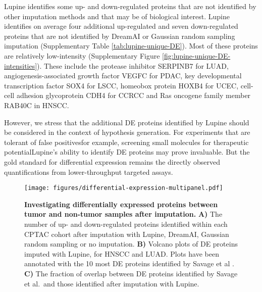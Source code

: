 \documentclass{article}
\newcommand{\fixme}[1]{{\color{red}{#1}}}
\begin{document}

Lupine identifies some up- and down-regulated proteins that are not identified by other imputation methods and that may be of biological interest. Lupine identifies on average four additional up-regulated and seven down-regulated proteins that are not identified by DreamAI or Gaussian random sampling imputation (Supplementary Table \ref{tab:lupine-unique-DE}). Most of these proteins are relatively low-intensity (Supplementary Figure \ref{fig:lupine-unique-DE-intensities}). These include the protease inhibitor SERPINB7 for LUAD, angiogenesis-associated growth factor VEGFC for PDAC, key developmental transcription factor SOX4 for LSCC, homeobox protein HOXB4 for UCEC, cell-cell adhesion glycoprotein CDH4 for CCRCC and Ras oncogene family member RAB40C in HNSCC. 

However, we stress that the additional DE proteins identified by Lupine should be considered in the context of hypothesis generation. For experiments that are tolerant of false positives\textemdash for example, screening small molecules for therapeutic potential\textemdash Lupine’s ability to identify DE proteins may prove invaluable. But the gold standard for differential expression remains the directly observed quantifications from lower-throughput targeted assays. 

\begin{figure}
  \centering
  \texttt{[image: figures/differential-expression-multipanel.pdf]}
  \caption{{\bf Investigating differentially expressed proteins between tumor and non-tumor samples after imputation.} 
  \textbf{A)} The number of up- and down-regulated proteins identified  within each CPTAC cohort after imputation with Lupine, DreamAI, Gaussian random sampling or no imputation. 
  \textbf{B)} Volcano plots of DE proteins imputed with Lupine, for HNSCC and LUAD.
  Plots have been annotated with the 10 most DE proteins identified by Savage et al \cite{savage-2024}.
  \textbf{C)} The fraction of overlap between DE proteins identified by Savage et al.\ and those identified after imputation with Lupine.}
  \label{fig:diff-expression}
\end{figure} 

\end{document}
